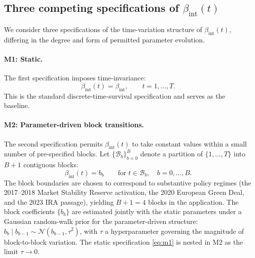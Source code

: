 \documentclass[12pt,a4paper]{article}
\newcommand{\bint}{\beta_{\text{int}}}
\theoremstyle{plain}
\theoremstyle{definition}
\begin{document}
\subsection{Three competing specifications of $\bint(t)$}
\label{sec:meth-specs}

We consider three specifications of the time-variation structure of $\bint(t)$, differing in the degree and form of permitted parameter evolution.

\paragraph{M1: Static.}
The first specification imposes time-invariance:
\begin{equation}
\bint(t) = \bint, \qquad t = 1, \ldots, T.
\label{eq:m1}
\end{equation}
This is the standard discrete-time-survival specification and serves as the baseline.

\paragraph{M2: Parameter-driven block transitions.}
The second specification permits $\bint(t)$ to take constant values within a small number of pre-specified blocks. Let $\{\mathcal{B}_b\}_{b=0}^B$ denote a partition of $\{1, \ldots, T\}$ into $B+1$ contiguous blocks:
\begin{equation}
\bint(t) = b_b \qquad \text{for } t \in \mathcal{B}_b, \quad b = 0, \ldots, B.
\label{eq:m2}
\end{equation}
The block boundaries are chosen to correspond to substantive policy regimes (the 2017--2018 Market Stability Reserve activation, the 2020 European Green Deal, and the 2023 IRA passage), yielding $B+1 = 4$ blocks in the application. The block coefficients $\{b_b\}$ are estimated jointly with the static parameters under a Gaussian random-walk prior for the parameter-driven structure: $b_b \mid b_{b-1} \sim \mathcal{N}(b_{b-1}, \tau^2)$, with $\tau$ a hyperparameter governing the magnitude of block-to-block variation. The static specification \eqref{eq:m1} is nested in M2 as the limit $\tau \to 0$.
\end{document}
